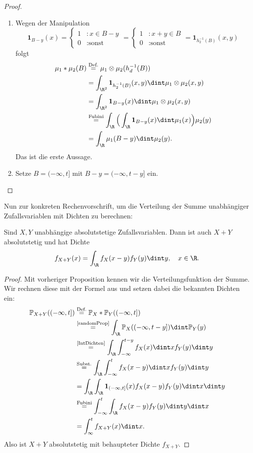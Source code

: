 \begin{proof}\abs
	\begin{enumerate}[label=(\roman*)]
		\item 
		Wegen der Manipulation
		 \[ \mathbf{1}_{B-y}(x) = \begin{cases}
		1&:x \in B-y\\
		0&:\text{sonst}
		\end{cases} = \begin{cases}
		1&: x+y \in B\\
		0&: \text{sonst}
		\end{cases} = \mathbf{1}_{h_2^{-1}(B)}(x,y) \]
		folgt
		\begin{align*}
		\mu_1 * \mu_2(B)& \overset{\text{Def.}}{=} \mu_1 \otimes \mu_2(h_d^{-1}(B)) \\
		&= \int_{\R^2} \mathbf{1}_{h_2^{-1}(B)}(x,y) \dint \mu_1\otimes \mu_2(x,y)\\
		& = \int_{\R^2} \mathbf{1}_{B-y}(x) \dint \mu_1\otimes \mu_2(x,y) \\
		&\overset{\text{Fubini}}{=} \int_{\R} \Big( \int_{\R} \mathbf{1}_{B-y}(x) \dint \mu_1(x) \Big) \mu_2(y)\\
		& = \int_{\R} \mu_1(B-y) \dint \mu_2(y).
		\end{align*}
		Das ist die erste Aussage.
		\item Setze $B = (-\infty,t]$ mit $B-y = (-\infty,t-y]$ ein.
	\end{enumerate}
\end{proof}
Nun zur konkreten Rechenvorschrift, um die Verteilung der Summe unabh\"angiger Zufallsvariablen mit Dichten zu berechnen:
\begin{prop}
	Sind $X,Y$ unabhängige absolutstetige Zufallsvariablen. Dann ist auch $X+Y$ absolutstetig und hat Dichte 
	\[ f_{X+Y}(x) = \int_{\R} f_X(x-y)f_Y(y) \dint y, \quad x\in\R.\]
\end{prop}
\begin{proof}
	Mit vorheriger Proposition kennen wir die Verteilungsfunktion der Summe. Wir rechnen diese mit der Formel aus und setzen dabei die bekannten Dichten ein:
	\begin{align*}
		\mathbb{P}_{X+Y}((-\infty,t])&\overset{\text{Def.}}{=}\mathbb{P}_X * \mathbb{P}_Y((-\infty,t])\\
		& \overset{\text{\ref{randomProp}}}{=} \int_{\R} \mathbb{P}_X ((-\infty,t-y]) \dint \mathbb{P}_Y(y) \\
		&\overset{\text{\ref{IntDichten}}}{=} \int_{\R} \int_{-\infty}^{t-y} f_X(x) \dint x f_Y(y) \dint y\\
		& \overset{\text{Subst.}}{=} \int_{\R} \int_{-\infty}^{t} f_X(x-y) \dint x f_Y(y) \dint y\\
		&= \int_{\R} \int_{\R} \mathbf{1}_{(-\infty,t]}(x) f_X(x-y) f_Y(y) \dint x \dint y\\
		& \overset{\text{Fubini}}{=} \int_{-\infty}^{t} \int_{\R} f_X(x-y) f_Y(y) \dint y \dint x\\
		&= \int_{\infty}^t f_{X+Y}(x)\dint x.	
	\end{align*}
	Also ist $X+Y$ absolutstetig mit behaupteter Dichte $f_{X+Y}$.
\end{proof}

